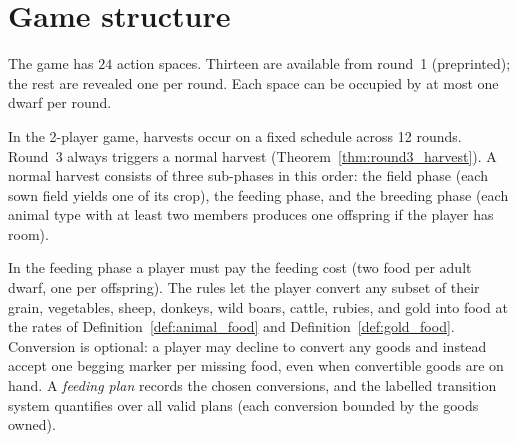 \section{Game structure}

\begin{definition}
  \label{def:action_spaces}
  \leanok
  The game has $24$ action spaces.  Thirteen are available from round~1
  (preprinted); the rest are revealed one per round.
  Each space can be occupied by at most one dwarf per round.
\end{definition}

\begin{definition}
  \label{def:harvest}
  \leanok
  In the 2-player game, harvests occur on a fixed schedule across 12 rounds.
  Round~3 always triggers a normal harvest (Theorem~\ref{thm:round3_harvest}).
  A normal harvest consists of three sub-phases in this order: the
  field phase (each sown field yields one of its crop), the feeding
  phase, and the breeding phase (each animal type with at least two
  members produces one offspring if the player has room).
\end{definition}

\begin{definition}
  \label{def:feeding_plan}
  \leanok
  In the feeding phase a player must pay the feeding cost (two food
  per adult dwarf, one per offspring).  The rules let the player
  convert any subset of their grain, vegetables, sheep, donkeys,
  wild boars, cattle, rubies, and gold into food at the rates of
  Definition~\ref{def:animal_food} and Definition~\ref{def:gold_food}.
  Conversion is optional: a player may decline to convert any goods
  and instead accept one begging marker per missing food, even when
  convertible goods are on hand.  A \emph{feeding plan} records the
  chosen conversions, and the labelled transition system quantifies
  over all valid plans (each conversion bounded by the goods owned).
\end{definition}

